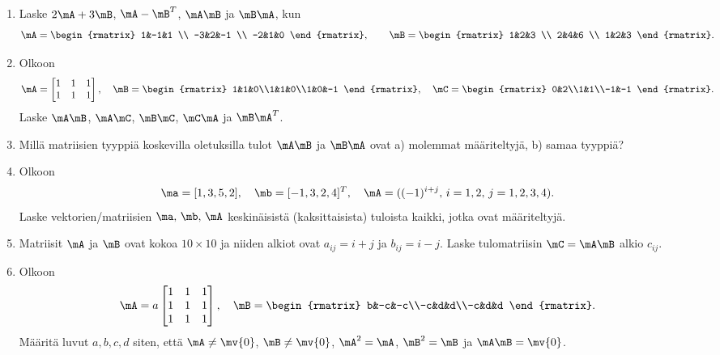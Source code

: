 \Harj
\begin{enumerate}

\item
Laske $2\mA+3\mB$, $\mA-\mB^T$, $\mA\mB$ ja $\mB\mA$, kun
\[
\mA=\begin{rmatrix} 1&-1&1 \\ -3&2&-1 \\ -2&1&0 \end{rmatrix}, \qquad
\mB=\begin{rmatrix} 1&2&3 \\ 2&4&6 \\ 1&2&3 \end{rmatrix}.
\]

\item
Olkoon
\[
\mA=\begin{bmatrix} 1&1&1\\1&1&1 \end{bmatrix}, \quad
\mB=\begin{rmatrix} 1&1&0\\1&1&0\\1&0&-1 \end{rmatrix}, \quad
\mC=\begin{rmatrix} 0&2\\1&1\\-1&-1 \end{rmatrix}.
\]
Laske $\mA\mB$, $\mA\mC$, $\mB\mC$, $\mC\mA$ ja $\mB\mA^T$. 

\item 
Millä matriisien tyyppiä koskevilla oletuksilla tulot $\mA\mB$ ja $\mB\mA$ ovat \newline
a) molemmat määriteltyjä, b) samaa tyyppiä?

\item
Olkoon 
\[
\ma=[1,3,5,2], \quad \mb=[-1,3,2,4]^T, \quad \mA=((-1)^{i+j},\, i=1,2,\, j=1,2,3,4).
\]
Laske vektorien/matriisien $\ma,\,\mb,\,\mA$ keskinäisistä (kaksittaisista) tuloista kaikki,
jotka ovat määriteltyjä.

\item
Matriisit $\mA$ ja $\mB$ ovat kokoa $10 \times 10$ ja niiden alkiot ovat $a_{ij}=i+j$ ja
$b_{ij}=i-j$. Laske tulomatriisin $\mC=\mA\mB$ alkio $c_{ij}$.

\item
Olkoon
\[
\mA=a\begin{bmatrix} 1&1&1\\1&1&1\\1&1&1 \end{bmatrix}, \quad
\mB=\begin{rmatrix} b&-c&-c\\-c&d&d\\-c&d&d \end{rmatrix}.
\]
Määritä luvut $a,b,c,d$ siten, että $\mA\neq\mv{0}$, $\mB\neq\mv{0}$, $\mA^2=\mA$, $\mB^2=\mB$
ja $\mA\mB=\mv{0}$. 


\end{enumerate}

